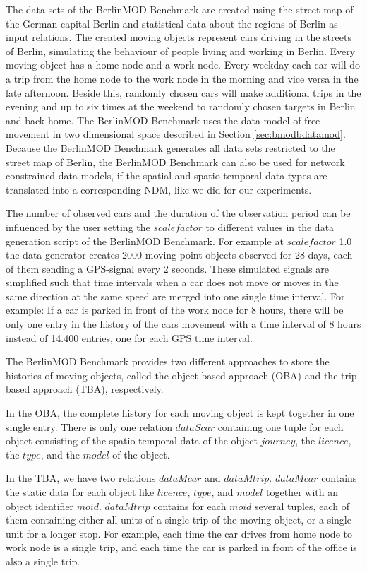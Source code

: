 \documentclass[a4paper]{article}
\newcommand{\bmodb} {BerlinMOD Benchmark}
\begin{document}
The data-sets of the \bmodb{} are created using the street map of the German
capital Berlin \cite{bbike} and statistical data about the regions of Berlin
\cite{bevberlin,berlinstadtatlas} as input relations.
The created moving objects represent cars driving in the streets of Berlin,
simulating the behaviour of people living and working in Berlin.
Every moving object has a home node and a work node. Every weekday each car will
do a trip from the home node to the work node in the morning and vice versa
in the late afternoon. Beside this, randomly chosen cars will make additional
trips in the evening and up to six times at the weekend to randomly chosen
targets in Berlin and back home. The \bmodb{} uses the data model of free
movement in two dimensional space described in Section \ref{sec:bmodbdatamod}.
Because the \bmodb{} generates all data sets restricted to the street map of
Berlin, the \bmodb{} can also be used for network constrained data models, if
the spatial and spatio-temporal data types are translated into a corresponding
NDM, like we did for our experiments.

The number of observed cars and the duration of the observation period can be
influenced by the user setting the $scalefactor$ to different values in the data
generation script of the \bmodb{}. For example at $scalefactor$ 1.0 the data
generator creates 2000 moving point objects observed for 28 days, each of them
sending a GPS-signal every 2 seconds. These simulated signals are simplified
such that time intervals when a car does not move or moves in the same direction
at the same speed are merged into one single time interval. For example: If a
car is parked in front of the work node for 8 hours, there will be only one
entry in the history of the cars movement with a time interval of 8 hours
instead of 14.400 entries, one for each GPS time interval.

The \bmodb{} provides two different approaches to store the histories of moving
objects, called the object-based approach (OBA) and the trip based approach (TBA),
respectively.

In the OBA, the complete history for each moving object is kept together in one
single entry. There is only one relation $dataScar$
containing one tuple for each object consisting of the spatio-temporal data of
the object $journey$, the $licence$, the $type$, and the $model$ of the object.

In the TBA, we have two relations $dataMcar$ and $dataMtrip$. $dataMcar$ contains
the static data for each object like $licence$, $type$, and $model$ together with
an object identifier $moid$. $dataMtrip$ contains for each $moid$ several tuples,
each of them containing either all units of a single trip of the moving object, or a
single unit for a longer stop. For example, each time the car drives from home node
to work node is a single trip, and each time the car is parked in front of the
office is also a single trip.
\end{document}
